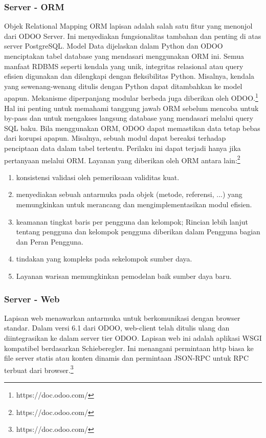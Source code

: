 \subsubsection{Server - ORM}

Objek Relational Mapping ORM lapisan adalah salah satu fitur yang menonjol dari  ODOO Server. Ini menyediakan fungsionalitas tambahan dan penting di atas server PostgreSQL. Model Data dijelaskan dalam Python dan  ODOO menciptakan tabel database yang mendasari menggunakan ORM ini. Semua manfaat RDBMS seperti kendala yang unik, integritas relasional atau query efisien digunakan dan dilengkapi dengan fleksibilitas Python. Misalnya, kendala yang sewenang-wenang ditulis dengan Python dapat ditambahkan ke model apapun. Mekanisme diperpanjang modular berbeda juga diberikan oleh  ODOO.\footnote{https://doc.odoo.com/}\\
Hal ini penting untuk memahami tanggung jawab ORM sebelum mencoba untuk by-pass dan untuk mengakses langsung database yang mendasari melalui query SQL baku. Bila menggunakan ORM,  ODOO dapat memastikan data tetap bebas dari korupsi apapun. Misalnya, sebuah modul dapat bereaksi terhadap penciptaan data dalam tabel tertentu. Perilaku ini dapat terjadi hanya jika pertanyaan melalui ORM.
Layanan yang diberikan oleh ORM antara lain:\footnote{https://doc.odoo.com/}
\begin{enumerate}
	\item konsistensi validasi oleh pemeriksaan validitas kuat.
	\item menyediakan sebuah antarmuka pada objek (metode, referensi, ...) yang memungkinkan untuk merancang dan mengimplementasikan modul efisien.
	\item keamanan tingkat baris per pengguna dan kelompok; Rincian lebih lanjut tentang pengguna dan kelompok pengguna diberikan dalam Pengguna bagian dan Peran Pengguna.
	\item tindakan yang kompleks pada sekelompok sumber daya.
	\item Layanan warisan memungkinkan pemodelan baik sumber daya baru.
\end{enumerate}

\subsubsection{Server - Web}
Lapisan web menawarkan antarmuka untuk berkomunikasi dengan browser standar. Dalam versi 6.1 dari  ODOO, web-client telah ditulis ulang dan diintegrasikan ke dalam server tier  ODOO. Lapisan web ini adalah aplikasi WSGI kompatibel berdasarkan Schieberegler. Ini menangani permintaan http biasa ke file server statis atau konten dinamis dan permintaan JSON-RPC untuk RPC terbuat dari browser.\footnote{https://doc.odoo.com/}

